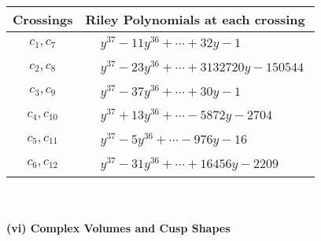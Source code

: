 \documentclass[1p]{elsarticle_modified}
\theoremstyle{definition}
\begin{document}
\begin{tabular}{m{50pt}|m{274pt}}
Crossings & \hspace{64pt}Riley Polynomials at each crossing \\
\hline $$\begin{aligned}c_{1},c_{7}\end{aligned}$$&$\begin{aligned}
&y^{37}-11 y^{36}+\cdots+32 y-1
\end{aligned}$\\
\hline $$\begin{aligned}c_{2},c_{8}\end{aligned}$$&$\begin{aligned}
&y^{37}-23 y^{36}+\cdots+3132720 y-150544
\end{aligned}$\\
\hline $$\begin{aligned}c_{3},c_{9}\end{aligned}$$&$\begin{aligned}
&y^{37}-37 y^{36}+\cdots+30 y-1
\end{aligned}$\\
\hline $$\begin{aligned}c_{4},c_{10}\end{aligned}$$&$\begin{aligned}
&y^{37}+13 y^{36}+\cdots-5872 y-2704
\end{aligned}$\\
\hline $$\begin{aligned}c_{5},c_{11}\end{aligned}$$&$\begin{aligned}
&y^{37}-5 y^{36}+\cdots-976 y-16
\end{aligned}$\\
\hline $$\begin{aligned}c_{6},c_{12}\end{aligned}$$&$\begin{aligned}
&y^{37}-31 y^{36}+\cdots+16456 y-2209
\end{aligned}$\\
\hline
\end{tabular}\\~\\
\newpage\flushleft \textbf{(vi) Complex Volumes and Cusp Shapes}
\end{document}
